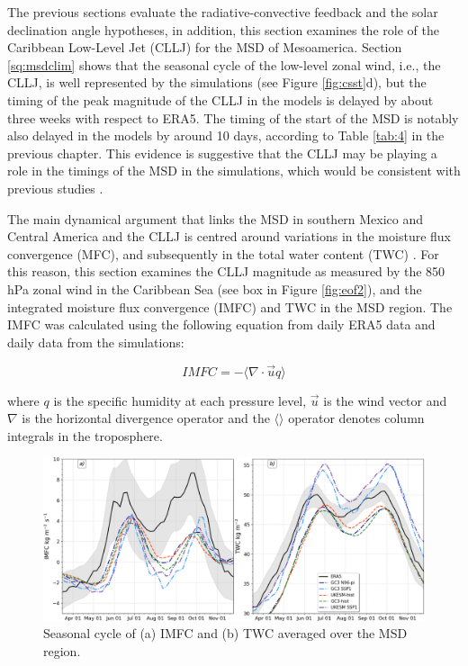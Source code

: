 The previous sections evaluate the radiative-convective feedback and the solar declination angle hypotheses, in addition, this section examines the role of the Caribbean Low-Level Jet (CLLJ) for the MSD of Mesoamerica. Section \ref{sq:msdclim} shows that the seasonal cycle of the low-level zonal wind, i.e., the CLLJ, is well represented by the simulations (see Figure \ref{fig:csst}d), but the timing of the peak magnitude of the CLLJ in the models is delayed by about three weeks with respect to ERA5. The timing of the start of the MSD is notably also delayed in the models by around 10 days, according to Table \ref{tab:4} in the previous chapter. This evidence is suggestive that the CLLJ may be playing a role in the timings of the MSD in the simulations, which would be consistent with previous studies \citep[e.g.][]{herrera2015,martinez2019}.


The main dynamical argument that links the MSD in southern Mexico and Central America and the CLLJ is centred around variations in the moisture flux convergence (MFC), and subsequently in the total water content (TWC) \citep[see e.g.][]{gamble2008,herrera2015,martinez2019,zermeno2019}. For this reason, this section examines the CLLJ magnitude as measured by the 850 hPa zonal wind in the Caribbean Sea (see box in Figure \ref{fig:eof2}), and the integrated moisture flux convergence (IMFC) and TWC in the MSD region. 
The IMFC was calculated using the following equation from daily ERA5 data and daily data from the simulations:

\begin{equation}
IMFC=-\Bigg\langle \nabla \cdot \vec{u}q \Bigg \rangle
\label{eq:waterbudget}
\end{equation}

\noindent where $q$ is the specific humidity at each pressure level, $\vec{u}$ is the wind vector and $\nabla$ is the horizontal divergence operator and the $\langle \rangle$ operator denotes column integrals in the troposphere.


 \begin{figure}[t!]
\includegraphics[width=\linewidth]{figures/imfd_index_seasonal}
\caption[Seasonal cycle of IMFC and TWC]{Seasonal cycle of (a) IMFC and (b) TWC averaged over the MSD region.}
\label{fig:imfd_cycle}
\end{figure}

